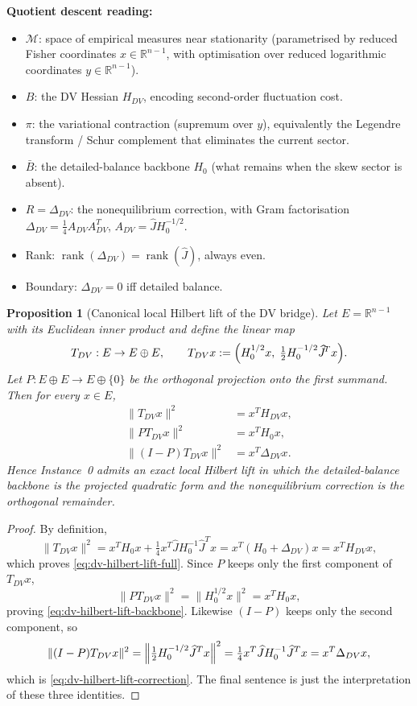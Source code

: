 \documentclass[11pt,a4paper]{article}
\numberwithin{equation}{section}
\DeclareMathOperator{\rank}{rank}
\newcommand{\R}{\mathbb{R}}
\theoremstyle{thmcompact}
\newtheorem{proposition}[theorem]{Proposition}
\theoremstyle{remark}
\begin{document}
\textbf{Quotient descent reading:}
\begin{itemize}[leftmargin=2em]
\item $\mathcal{M}$: space of empirical measures near stationarity (parametrised by reduced Fisher coordinates $x \in \R^{n-1}$, with optimisation over reduced logarithmic coordinates $y \in \R^{n-1}$).
\item $B$: the DV Hessian $H_{DV}$, encoding second-order fluctuation cost.
\item $\pi$: the variational contraction (supremum over $y$), equivalently the Legendre transform / Schur complement that eliminates the current sector.
\item $\bar{B}$: the detailed-balance backbone $H_0$ (what remains when the skew sector is absent).
\item $R = \Delta_{DV}$: the nonequilibrium correction, with Gram factorisation $\Delta_{DV} = \tfrac{1}{4}A_{DV}A_{DV}^T$, $A_{DV} = \widehat{J}H_0^{-1/2}$.
\item Rank: $\rank(\Delta_{DV}) = \rank(\widehat{J})$, always even.
\item Boundary: $\Delta_{DV} = 0$ iff detailed balance.
\end{itemize}

\begin{proposition}[Canonical local Hilbert lift of the DV bridge]\label{prop:dv-hilbert-lift}
Let $E=\R^{n-1}$ with its Euclidean inner product and define the linear map
\begin{equation}\label{eq:dv-hilbert-lift-map}
T_{DV}:E\to E\oplus E,
\qquad
T_{DV}x:=\Bigl(H_0^{1/2}x,\;\tfrac12 H_0^{-1/2}\widehat J^{\!T}x\Bigr).
\end{equation}
Let $P:E\oplus E\to E\oplus\{0\}$ be the orthogonal projection onto the first summand. Then for every $x\in E$,
\begin{align}
\|T_{DV}x\|^2 &= x^T H_{DV}x, \label{eq:dv-hilbert-lift-full}\\
\|PT_{DV}x\|^2 &= x^T H_0 x, \label{eq:dv-hilbert-lift-backbone}\\
\|(I-P)T_{DV}x\|^2 &= x^T \Delta_{DV} x. \label{eq:dv-hilbert-lift-correction}
\end{align}
Hence Instance~0 admits an exact local Hilbert lift in which the detailed-balance backbone is the projected quadratic form and the nonequilibrium correction is the orthogonal remainder.
\end{proposition}

\begin{proof}
By definition,
\[
\|T_{DV}x\|^2
= x^T H_0 x + \tfrac14 x^T \widehat J H_0^{-1}\widehat J^T x
= x^T(H_0+\Delta_{DV})x
= x^T H_{DV}x,
\]
which proves \eqref{eq:dv-hilbert-lift-full}. Since $P$ keeps only the first component of $T_{DV}x$,
\[
\|PT_{DV}x\|^2=\|H_0^{1/2}x\|^2=x^T H_0 x,
\]
proving \eqref{eq:dv-hilbert-lift-backbone}. Likewise $(I-P)$ keeps only the second component, so
\[
\|(I-P)T_{DV}x\|^2
= \Bigl\|\tfrac12 H_0^{-1/2}\widehat J^T x\Bigr\|^2
= \tfrac14 x^T \widehat J H_0^{-1}\widehat J^T x
= x^T \Delta_{DV}x,
\]
which is \eqref{eq:dv-hilbert-lift-correction}. The final sentence is just the interpretation of these three identities.
\end{proof}
\end{document}
